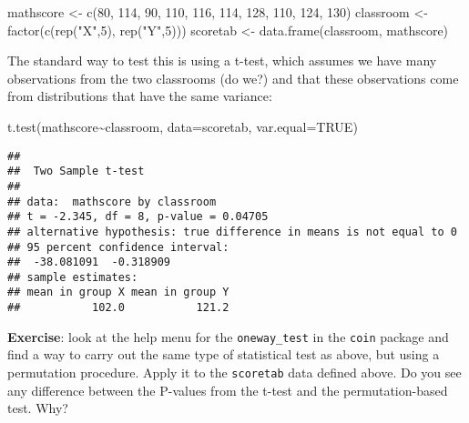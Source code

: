 \documentclass[
]{book}
\newenvironment{Shaded}{\begin{snugshade}}{\end{snugshade}}
\newcommand{\AttributeTok}[1]{\textcolor[rgb]{0.77,0.63,0.00}{#1}}
\newcommand{\ConstantTok}[1]{\textcolor[rgb]{0.00,0.00,0.00}{#1}}
\newcommand{\DecValTok}[1]{\textcolor[rgb]{0.00,0.00,0.81}{#1}}
\newcommand{\FunctionTok}[1]{\textcolor[rgb]{0.00,0.00,0.00}{#1}}
\newcommand{\NormalTok}[1]{#1}
\newcommand{\OtherTok}[1]{\textcolor[rgb]{0.56,0.35,0.01}{#1}}
\newcommand{\SpecialCharTok}[1]{\textcolor[rgb]{0.00,0.00,0.00}{#1}}
\newcommand{\StringTok}[1]{\textcolor[rgb]{0.31,0.60,0.02}{#1}}
\begin{document}
\begin{Shaded}
\begin{Highlighting}[]
\NormalTok{mathscore }\OtherTok{\textless{}{-}} \FunctionTok{c}\NormalTok{(}\DecValTok{80}\NormalTok{, }\DecValTok{114}\NormalTok{, }\DecValTok{90}\NormalTok{, }\DecValTok{110}\NormalTok{, }\DecValTok{116}\NormalTok{, }\DecValTok{114}\NormalTok{, }\DecValTok{128}\NormalTok{, }\DecValTok{110}\NormalTok{, }\DecValTok{124}\NormalTok{, }\DecValTok{130}\NormalTok{)}
\NormalTok{classroom }\OtherTok{\textless{}{-}} \FunctionTok{factor}\NormalTok{(}\FunctionTok{c}\NormalTok{(}\FunctionTok{rep}\NormalTok{(}\StringTok{"X"}\NormalTok{,}\DecValTok{5}\NormalTok{), }\FunctionTok{rep}\NormalTok{(}\StringTok{"Y"}\NormalTok{,}\DecValTok{5}\NormalTok{)))}
\NormalTok{scoretab }\OtherTok{\textless{}{-}} \FunctionTok{data.frame}\NormalTok{(classroom, mathscore)}
\end{Highlighting}
\end{Shaded}

The standard way to test this is using a t-test, which assumes we have many observations from the two classrooms (do we?) and that these observations come from distributions that have the same variance:

\begin{Shaded}
\begin{Highlighting}[]
\FunctionTok{t.test}\NormalTok{(mathscore}\SpecialCharTok{\textasciitilde{}}\NormalTok{classroom, }\AttributeTok{data=}\NormalTok{scoretab, }\AttributeTok{var.equal=}\ConstantTok{TRUE}\NormalTok{)}
\end{Highlighting}
\end{Shaded}

\begin{verbatim}
## 
##  Two Sample t-test
## 
## data:  mathscore by classroom
## t = -2.345, df = 8, p-value = 0.04705
## alternative hypothesis: true difference in means is not equal to 0
## 95 percent confidence interval:
##  -38.081091  -0.318909
## sample estimates:
## mean in group X mean in group Y 
##           102.0           121.2
\end{verbatim}

\textbf{Exercise}: look at the help menu for the \texttt{oneway\_test} in the \texttt{coin} package and find a way to carry out the same type of statistical test as above, but using a permutation procedure. Apply it to the \texttt{scoretab} data defined above. Do you see any difference between the P-values from the t-test and the permutation-based test. Why?

  
\end{document}
